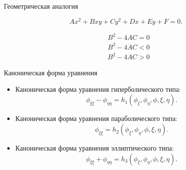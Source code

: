 \documentclass[10pt,xcolor=pst,aspectratio=169]{beamer}
\begin{document}
\begin{frame}{Геометрическая аналогия}

	\transdissolve[duration=0.1]
	\justifying
	\large

	\vspace{-60pt}

	\[
    	A x^{2} + B x y + C y^{2} + D x + E y + F = 0.
	\]

    \begin{figure}
        \vspace{-20pt}
    \end{figure}

	\[
	    \begin{split}
    	    &B^{2} - 4 A C = 0 \\
    	    &B^{2} - 4 A C < 0 \\
    	    &B^{2} - 4 A C > 0
    	\end{split}
	\]

\end{frame}

\begin{frame}{Каноническая форма уравнения}

	\transdissolve[duration=0.1]
	\justifying
	\large

	\begin{itemize}
		\item Каноническая форма уравнения гиперболического типа:
		    \[
			    \phi_{\xi \xi} - \phi_{\eta \eta} = h_{1}(\phi_{\xi}, \phi_{\eta}, \phi, \xi, \eta).
		    \]

		\item Каноническая форма уравнения параболического типа:
		    \[
			    \phi_{\xi \xi} = h_{2}(\phi_{\xi}, \phi_{\eta}, \phi, \xi, \eta).
		    \]

		\item Каноническая форма уравнения эллиптического типа:
		    \[
			    \phi_{\xi \xi} + \phi_{\eta \eta} = h_{3}(\phi_{\xi}, \phi_{\eta}, \phi, \xi, \eta).
		    \]
	\end{itemize}

\end{frame}
\end{document}
